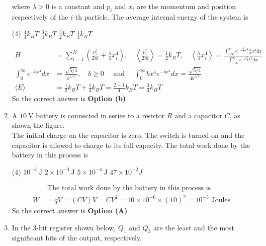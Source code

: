 \begin{enumerate}
$$$$
where $\lambda>0$ is a constant and $p_{i}$ and $x_{i}$ are the momentum and position respectively of the $i$-th particle. The average internal energy of the system is
 \begin{tasks}(4)
	\task[\textbf{a.}]$\frac{4}{3} k_{B} T$
	\task[\textbf{b.}]$\frac{3}{4} k_{B} T$
	\task[\textbf{c.}] $\frac{3}{2} k_{B} T$
	\task[\textbf{d.}] $\frac{1}{3} k_{B} T$
\end{tasks}	
\begin{answer}
	\begin{align*}
	H&=\sum_{i=1}^{N}\left(\frac{p_{i}^{2}}{2 m}+\frac{\lambda}{4} x_{i}^{4}\right), \quad\left\langle\frac{p_{i}^{2}}{2 m}\right\rangle=\frac{1}{2} k_{B} T, \quad\left\langle\frac{\lambda}{4} x_{i}^{4}\right\rangle=\frac{\int_{-\infty}^{\infty} e^{-\beta \frac{\lambda}{4} x^{4}} \frac{\lambda}{4} x^{4} d x}{\int_{-\infty}^{\infty} e^{-\beta \frac{\lambda}{4} x^{4}} d x}\\
	\int_{0}^{\infty} e^{-b x^{4}} d x&=\frac{\sqrt{5 / 4}}{b^{1 / 4}}, \quad b \geq 0 \quad \text { and } \quad \int_{0}^{\infty} b x^{4} e^{-b x^{4}} d x=\frac{\sqrt{5 / 4}}{4 b^{1 / 4}}\\
	\langle E\rangle&=\frac{1}{2} k_{B} T+\frac{1}{4} k_{B} T=\frac{2+1}{4} k_{B} T=\frac{3}{4} k_{B} T
	\end{align*}
	So the correct answer is \textbf{Option (b)}
\end{answer}
\item A $10 \mathrm{~V}$ battery is connected in series to a resistor $R$ and a capacitor $C$, as shown the figure.\\
The initial charge on the capacitor is zero. The switch is turned on and the capacitor is allowed to charge to its full capacity. The total work done by the battery in this process is
 \begin{tasks}(4)
	\task[\textbf{a.}]$10^{-3} \mathrm{~J}$
	\task[\textbf{b.}]$2 \times 10^{-3} \mathrm{~J}$
	\task[\textbf{c.}]$5 \times 10^{-4} \mathrm{~J}$
	\task[\textbf{d.}] $47 \times 10^{-2} J$
\end{tasks}
\begin{answer}
	\begin{align*}
&\text{ The total work done by the battery in this process is}\\
	W&=q V=(C V) V=C V^{2}=10 \times 10^{-6} \times(10)^{2}=10^{-3} \text { Joules }
	\end{align*}
		So the correct answer is \textbf{Option (A)}
\end{answer}
\item In the 3-bit register shown below, $Q_{1}$ and $Q_{3}$ are the least and the most significant bits of the output, respectively.

\end{enumerate}
